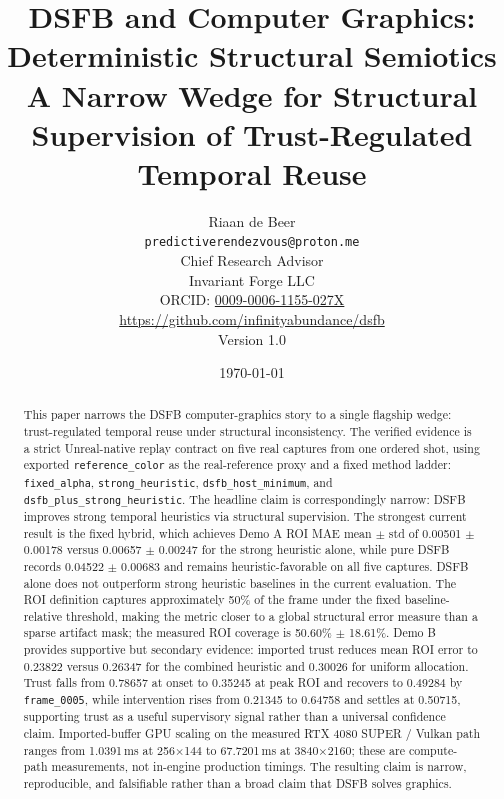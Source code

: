\documentclass[11pt]{article}
\title{
    \LARGE \textbf{DSFB and Computer Graphics: Deterministic Structural Semiotics}\\[0.4em]
    \large A Narrow Wedge for Structural Supervision of Trust-Regulated Temporal Reuse
    }
\author{
  Riaan de Beer\\
  \texttt{predictiverendezvous@proton.me}\\
  Chief Research Advisor\\[0.5em]
  Invariant Forge LLC\\
  \small
  ORCID: \href{https://orcid.org/0009-0006-1155-027X}{0009-0006-1155-027X}\\
  \href{https://github.com/infinityabundance/dsfb}{https://github.com/infinityabundance/dsfb}\\[0.5em]
  \small Version 1.0
}
\date{\today}
\theoremstyle{definition}
\theoremstyle{plain}
\begin{document}
\maketitle

\begin{abstract}
This paper narrows the DSFB computer-graphics story to a single flagship wedge: trust-regulated temporal reuse under structural inconsistency. The verified evidence is a strict Unreal-native replay contract on five real captures from one ordered shot, using exported \texttt{reference\_color} as the real-reference proxy and a fixed method ladder: \texttt{fixed\_alpha}, \texttt{strong\_heuristic}, \texttt{dsfb\_host\_minimum}, and \texttt{dsfb\_plus\_strong\_heuristic}. The headline claim is correspondingly narrow: DSFB improves strong temporal heuristics via structural supervision. The strongest current result is the fixed hybrid, which achieves Demo A ROI MAE mean $\pm$ std of 0.00501 $\pm$ 0.00178 versus 0.00657 $\pm$ 0.00247 for the strong heuristic alone, while pure DSFB records 0.04522 $\pm$ 0.00683 and remains heuristic-favorable on all five captures. DSFB alone does not outperform strong heuristic baselines in the current evaluation. The ROI definition captures approximately 50\% of the frame under the fixed baseline-relative threshold, making the metric closer to a global structural error measure than a sparse artifact mask; the measured ROI coverage is 50.60\% $\pm$ 18.61\%. Demo B provides supportive but secondary evidence: imported trust reduces mean ROI error to 0.23822 versus 0.26347 for the combined heuristic and 0.30026 for uniform allocation. Trust falls from 0.78657 at onset to 0.35245 at peak ROI and recovers to 0.49284 by \texttt{frame\_0005}, while intervention rises from 0.21345 to 0.64758 and settles at 0.50715, supporting trust as a useful supervisory signal rather than a universal confidence claim. Imported-buffer GPU scaling on the measured RTX 4080 SUPER / Vulkan path ranges from 1.0391\,ms at 256$\times$144 to 67.7201\,ms at 3840$\times$2160; these are compute-path measurements, not in-engine production timings. The resulting claim is narrow, reproducible, and falsifiable rather than a broad claim that DSFB solves graphics.
\end{abstract}
\end{document}
